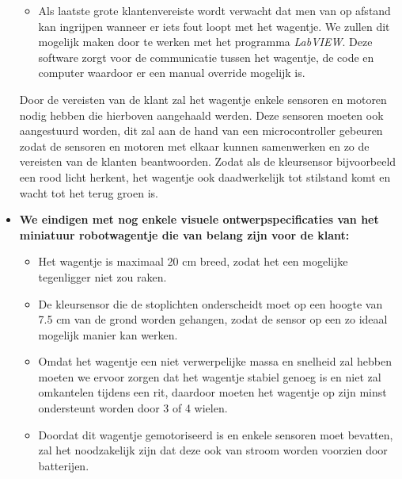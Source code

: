 \documentclass[12pt]{article}
\begin{document}
\begin{itemize}
\begin{itemize}
	    \item Als laatste grote klantenvereiste wordt verwacht dat men van op afstand kan ingrijpen wanneer er iets fout loopt met het wagentje. We zullen dit mogelijk maken door te werken met het programma \textit{LabVIEW}.
	    Deze software zorgt voor de communicatie tussen het wagentje, de code en computer waardoor er een manual override mogelijk is. 
	\end{itemize}
	Door de vereisten van de klant zal het wagentje enkele sensoren en motoren nodig hebben die hierboven aangehaald werden.
	Deze sensoren moeten ook aangestuurd worden, dit zal aan de hand van een microcontroller gebeuren zodat de sensoren en motoren met elkaar kunnen samenwerken en zo de vereisten van de klanten beantwoorden.
	Zodat als de kleursensor bijvoorbeeld een rood licht herkent, het wagentje ook daadwerkelijk tot stilstand komt en wacht tot het terug groen is.
	
	\item\textbf{We eindigen met nog enkele visuele ontwerpspecificaties van het miniatuur robotwagentje die van belang zijn voor de klant:}
	
	\begin{itemize}
		\item Het wagentje is maximaal 20 cm breed, zodat het een mogelijke tegenligger niet zou raken.
		\item De kleursensor die de stoplichten onderscheidt moet op een hoogte van 7.5 cm van de grond worden gehangen, zodat de sensor op een zo ideaal mogelijk manier kan werken.
		\item Omdat het wagentje een niet verwerpelijke massa en snelheid zal hebben moeten we ervoor zorgen dat het wagentje stabiel genoeg is en niet zal omkantelen tijdens een rit, daardoor moeten het wagentje op zijn minst
		ondersteunt worden door 3 of 4 wielen.
		\item Doordat dit wagentje gemotoriseerd is en enkele sensoren moet bevatten, zal het noodzakelijk zijn dat deze ook van stroom worden voorzien door batterijen.
	\end{itemize}
	
	

\end{itemize}
\end{document}

